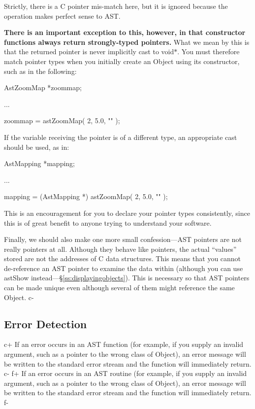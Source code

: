 \documentclass[twoside,11pt]{starlink}
\providecommand{\secref}[1]{\S\ref{#1}}
\begin{document}
Strictly, there is a C pointer mis-match here, but it is ignored
because the operation makes perfect sense to AST.

\textbf{There is an important exception to this, however, in that
constructor functions always return strongly-typed pointers.}  What
we mean by this is that the returned pointer is never implicitly cast
to void$*$. You must therefore match pointer types when you initially
create an Object using its constructor, such as in the following:

\small
\begin{terminalv}
AstZoomMap *zoommap;

...

zoommap = astZoomMap( 2, 5.0, "" );
\end{terminalv}
\normalsize

If the variable receiving the pointer is of a different type, an
appropriate cast should be used, as in:

\small
\begin{terminalv}
AstMapping *mapping;

...

mapping = (AstMapping *) astZoomMap( 2, 5.0, "" );
\end{terminalv}
\normalsize

This is an encouragement for you to declare your pointer types
consistently, since this is of great benefit to anyone trying to
understand your software.

Finally, we should also make one more small confession---AST pointers
are not really pointers at all.  Although they behave like pointers,
the actual ``values'' stored are not the addresses of C data
structures. This means that you cannot de-reference an AST pointer to
examine the data within (although you can use astShow
instead---\secref{ss:displayingobjects}). This is necessary so that AST
pointers can be made unique even although several of them might
reference the same Object.
c-

\subsection{\label{ss:errordetection}Error Detection}

c+
If an error occurs in an AST function (for example, if you supply an
invalid argument, such as a pointer to the wrong class of Object), an
error message will be written to the standard error stream and the
function will immediately return.
c-
f+
If an error occurs in an AST routine (for example, if you supply an
invalid argument, such as a pointer to the wrong class of Object), an
error message will be written to the standard error stream and the
function will immediately return.
f-
\end{document}

